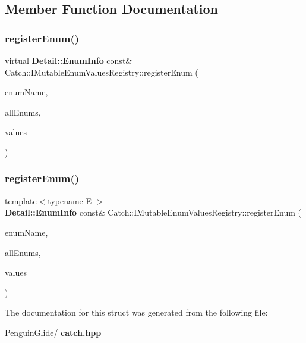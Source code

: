 \subsection{Member Function Documentation}
\mbox{\label{struct_catch_1_1_i_mutable_enum_values_registry_a948e66e85f5b66ab68256d50bfe548f4}} 
\subsubsection{registerEnum()\hspace{0.1cm}{\footnotesize\ttfamily [1/2]}}
{\footnotesize\ttfamily virtual \textbf{ Detail\+::\+Enum\+Info} const\& Catch\+::\+I\+Mutable\+Enum\+Values\+Registry\+::register\+Enum (\begin{DoxyParamCaption}\item[{\textbf{ String\+Ref}}]{enum\+Name,  }\item[{\textbf{ String\+Ref}}]{all\+Enums,  }\item[{std\+::vector$<$ int $>$ const \&}]{values }\end{DoxyParamCaption})\hspace{0.3cm}{\ttfamily [pure virtual]}}

\mbox{\label{struct_catch_1_1_i_mutable_enum_values_registry_a60e4546c6fd45f9be68e43410403b562}} 
\subsubsection{registerEnum()\hspace{0.1cm}{\footnotesize\ttfamily [2/2]}}
{\footnotesize\ttfamily template$<$typename E $>$ \\
\textbf{ Detail\+::\+Enum\+Info} const\& Catch\+::\+I\+Mutable\+Enum\+Values\+Registry\+::register\+Enum (\begin{DoxyParamCaption}\item[{\textbf{ String\+Ref}}]{enum\+Name,  }\item[{\textbf{ String\+Ref}}]{all\+Enums,  }\item[{std\+::initializer\+\_\+list$<$ E $>$}]{values }\end{DoxyParamCaption})\hspace{0.3cm}{\ttfamily [inline]}}



The documentation for this struct was generated from the following file\+:\begin{DoxyCompactItemize}
\item 
Penguin\+Glide/\textbf{ catch.\+hpp}\end{DoxyCompactItemize}
